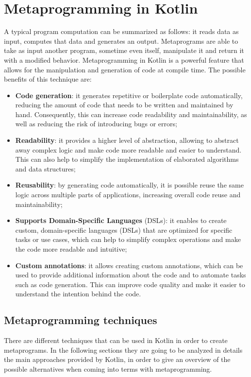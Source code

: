 \chapter{Metaprogramming in Kotlin}\label{chapter:metaprogramming}
A typical program computation can be summarized as follows: it reads data as input, computes that data and generates an output. Metaprograms \cite{metaprogramming_introduction} are able to take as input another program, sometime even itself, manipulate it and return it with a modified behavior.\newline
Metaprogramming in Kotlin is a powerful feature that allows for the manipulation and generation of code at compile time. The possible benefits of this technique are:
\begin{itemize}
    \item \textbf{Code generation}: it generates repetitive or boilerplate code automatically, reducing the amount of code that needs to be written and maintained by hand. Consequently, this can increase code readability and maintainability, as well as reducing the risk of introducing bugs or errors;
    \item \textbf{Readability}: it provides a higher level of abstraction, allowing to abstract away complex logic and make code more readable and easier to understand. This can also help to simplify the implementation of elaborated algorithms and data structures;
    \item \textbf{Reusability}: by generating code automatically, it is possible reuse the same logic across multiple parts of applications, increasing overall code reuse and maintainability;
    \item \textbf{Supports Domain-Specific Languages} (DSLs): it enables to create custom, domain-specific languages (DSLs) that are optimized for specific tasks or use cases, which can help to simplify complex operations and make the code more readable and intuitive;
    \item \textbf{Custom annotations}: it allows creating custom annotations, which can be used to provide additional information about the code and to automate tasks such as code generation. This can improve code quality and make it easier to understand the intention behind the code.
\end{itemize}

\section{Metaprogramming techniques}
There are different techniques that can be used in Kotlin in order to create metaprograms. In the following sections they are going to be analyzed in details the main approaches provided by Kotlin, in order to give an overview of the possible alternatives when coming into terms with metaprogramming.

